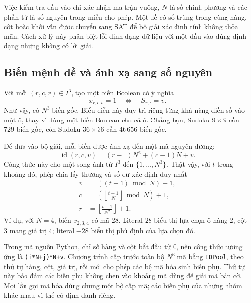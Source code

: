 \documentclass[a4paper,fleqn]{cas-sc}
\begin{document}
Việc kiểm tra đầu vào chỉ xác nhận ma trận vuông, $N$ là số chính phương
và các phần tử là số nguyên trong miền cho phép. Một đề có số trùng
trong cùng hàng, cột hoặc khối vẫn được chuyển sang SAT để bộ giải xác
định tính không thỏa mãn. Cách xử lý này phân biệt lỗi định dạng dữ liệu
với một đầu vào đúng định dạng nhưng không có lời giải.

\subsection{Biến mệnh đề và ánh xạ sang số nguyên}

Với mỗi $(r,c,v)\in I^3$, tạo một biến Boolean có ý nghĩa
\begin{equation}
 x_{r,c,v}=1\quad\Longleftrightarrow\quad S_{r,c}=v.
 \label{eq:method-variable-semantics}
\end{equation}
Như vậy, có $N^3$ biến gốc. Biểu diễn này duy trì riêng từng khả năng
điền số vào một ô, thay vì dùng một biến Boolean cho cả ô.
Chẳng hạn, Sudoku $9\times9$ cần $729$ biến gốc, còn Sudoku
$36\times36$ cần $46\,656$ biến gốc.

Để đưa vào bộ giải, mỗi biến được ánh xạ đến một mã nguyên dương:
\begin{equation}
 \operatorname{id}(r,c,v)=(r-1)N^2+(c-1)N+v.
 \label{eq:method-id}
\end{equation}
Công thức này cho một song ánh từ $I^3$ đến
$\{1,\ldots,N^3\}$. Thật vậy, với $t$ trong khoảng đó, phép chia lấy
thương và số dư xác định duy nhất
\begin{align}
 v&=((t-1)\bmod N)+1,\nonumber\\
 c&=\left(\left\lfloor\frac{t-1}{N}\right\rfloor\bmod N\right)+1,
 \label{eq:method-id-inverse}\\
 r&=\left\lfloor\frac{t-1}{N^2}\right\rfloor+1.\nonumber
\end{align}
Ví dụ, với $N=4$, biến $x_{2,3,4}$ có mã $28$.
Literal $28$ biểu thị lựa chọn ô hàng $2$, cột $3$ mang giá trị $4$;
literal $-28$ biểu thị phủ định của lựa chọn đó.

Trong mã nguồn Python, chỉ số hàng và cột bắt đầu từ $0$, nên công thức
tương ứng là \texttt{(i*N+j)*N+v}. Chương trình cấp trước toàn bộ
$N^3$ mã bằng \texttt{IDPool}, theo thứ tự hàng, cột, giá trị, rồi mới
cho phép các bộ mã hóa sinh biến phụ. Thứ tự này bảo đảm các biến phụ
không chen vào khoảng mã dùng để giải mã bàn cờ. Mọi lần gọi mã hóa dùng
chung một bộ cấp mã; các biến phụ của những nhóm khác nhau vì thế có
định danh riêng.
\end{document}
